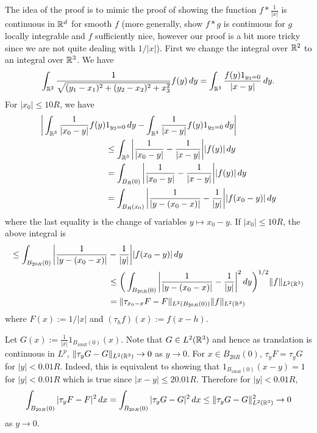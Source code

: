The idea of the proof is to mimic the proof of showing the function $f \ast \frac{1}{|x|}$ is continuous in $\mathbb{R}^{d}$ for smooth $f$ (more generally, show $f \ast g$ is continuous
for $g$ locally integrable and $f$ sufficiently nice, however our proof is a bit more tricky since we are not quite dealing with $1/|x|$). First we change the integral
over $\mathbb{R}^{2}$ to an integral over $\mathbb{R}^{3}$. We have
\begin{align*}
\int_{\mathbb{R}^{2}}\frac{1}{\sqrt{(y_{1} - x_{1})^{2} + (y_{2} - x_{2})^{2} + x_{3}^{2}}}f(y)\, dy = \int_{\mathbb{R}^{3}}\frac{f(y)1_{y_{3} = 0}}{|x - y|}\, dy.
\end{align*}
For $|x_{0}| \leq 10R$, we have
\begin{align*}
\bigg|\int_{\mathbb{R}^{3}}\frac{1}{|x_{0} - y|}f(y)&1_{y_{3} = 0}\, dy - \int_{\mathbb{R}^{3}}\frac{1}{|x - y|}f(y)1_{y_{3} = 0}\, dy\bigg|\\
&\leq \int_{\mathbb{R}^{3}}\bigg|\frac{1}{|x_{0} - y|} - \frac{1}{|x - y|}\bigg||f(y)|\, dy\\
&= \int_{B_{R}(0)}\bigg|\frac{1}{|x_{0} - y|} - \frac{1}{|x - y|}\bigg||f(y)|\, dy\\
&= \int_{B_{R}(x_{0})}\bigg|\frac{1}{|y - (x_{0} - x)|} - \frac{1}{|y|}\bigg||f(x_{0} - y)|\, dy
\end{align*}
where the last equality is the change of variables $y \mapsto x_{0} - y$. If $|x_{0}| \leq 10R$, the above integral is
\begin{align*}
\leq \int_{B_{20R}(0)}\bigg|\frac{1}{|y - (x_{0} - x)|} &- \frac{1}{|y|}\bigg||f(x_{0} - y)|\, dy\\
&\leq \bigg(\int_{B_{20R}(0)}\bigg|\frac{1}{|y - (x_{0} - x)|} - \frac{1}{|y|}\bigg|^{2}\, dy\bigg)^{1/2}\| f \|_{L^{2}(\mathbb{R}^{3})}\\
&= \| \tau_{x_{0} - x}F - F \|_{L^{2}(B_{20R}(0))}\| f \|_{L^{2}(\mathbb{R}^{3})}
\end{align*}
where $F(x) := 1/|x|$ and $(\tau_{h}f)(x) := f(x- h)$.

Let $G(x) := \frac{1}{|x|}1_{B_{100R}(0)}(x)$. Note that $G \in L^{2}(\mathbb{R}^{3})$ and hence as translation is continuous in $L^{p}$,
$\| \tau_{y} G - G \|_{L^{2}(\mathbb{R}^{3})} \rightarrow 0$ as $y \rightarrow 0$. For $x \in B_{20R}(0)$, $\tau_{y}F = \tau_{y}G$ for $|y| < 0.01R$.
Indeed, this is equivalent to showing that $1_{B_{100R}(0)}(x - y) = 1$ for $|y| < 0.01R$ which is true since $|x - y| \leq 20.01R$. Therefore for $|y| < 0.01R$,
\begin{align}\label{s115eq1}
\int_{B_{20R}(0)}|\tau_{y}F - F|^{2}\, dx = \int_{B_{20R}(0)}|\tau_{y}G - G|^{2}\, dx \leq \| \tau_{y}G - G \|_{L^{2}(\mathbb{R}^{3})}^{2} \rightarrow 0
\end{align}
as $y \rightarrow 0$.

